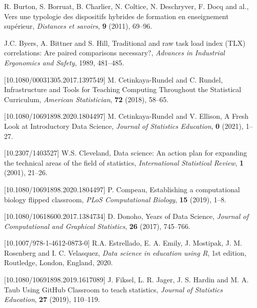 \documentclass{aims}
\theoremstyle{definition}
\begin{document}
\begin{thebibliography}{99}
     \newblock  R. Burton, S. Borruat, B. Charlier, N. Coltice, N. Deschryver, F. Docq and al.,
     \newblock Vers une typologie des dispositifs hybrides de formation en enseignement supérieur,
     \newblock \emph{Distances et savoirs}, \textbf{9} (2011), 69--96.

     \newblock  J.C. Byers, A. Bittner and S. Hill,
     \newblock Traditional and raw task load index (TLX) correlations: Are paired comparisons necessary?,
     \newblock \emph{Advances in Industrial Ergonomics and Safety}, 1989, 481--485.

 [10.1080/00031305.2017.1397549]
     \newblock  M. Cetinkaya-Rundel and C. Rundel,
     \newblock Infrastructure and Tools for Teaching Computing Throughout the Statistical Curriculum,
     \newblock \emph{American Statistician}, \textbf{72} (2018), 58--65.

 [10.1080/10691898.2020.1804497]
     \newblock  M. Cetinkaya-Rundel and V. Ellison,
     \newblock A Fresh Look at Introductory Data Science,
     \newblock \emph{Journal of Statistics Education}, \textbf{0} (2021), 1--27.

 [10.2307/1403527]
     \newblock W.S. Cleveland,
     \newblock Data science: An action plan for expanding the technical areas of the field of statistics,
     \newblock \emph{International Statistical Review}, \textbf{1} (2001), 21--26.

 [10.1080/10691898.2020.1804497]
     \newblock P. Compeau,
     \newblock Establishing a computational biology flipped classroom,
     \newblock \emph{PLoS Computational Biology}, \textbf{15} (2019), 1--8.

 [10.1080/10618600.2017.1384734]
     \newblock  D. Donoho,
      Years of Data Science,
     \newblock \emph{Journal of Computational and Graphical Statistics}, \textbf{26} (2017), 745--766.

 [10.1007/978-1-4612-0873-0]
     \newblock R.A. Estrellado, E. A. Emily, J. Mostipak, J. M. Rosenberg and I. C. Velasquez,
     \newblock \emph{Data science in education using R},
     \newblock 1st edition, Routledge, London, England, 2020.

 [10.1080/10691898.2019.1617089]
     \newblock J. Fiksel, L. R. Jager, J. S. Hardin and M. A. Taub
     \newblock Using GitHub Classroom to teach statistics,
     \newblock \emph{Journal of Statistics Education}, \textbf{27} (2019), 110--119.


\end{thebibliography}
\end{document}
